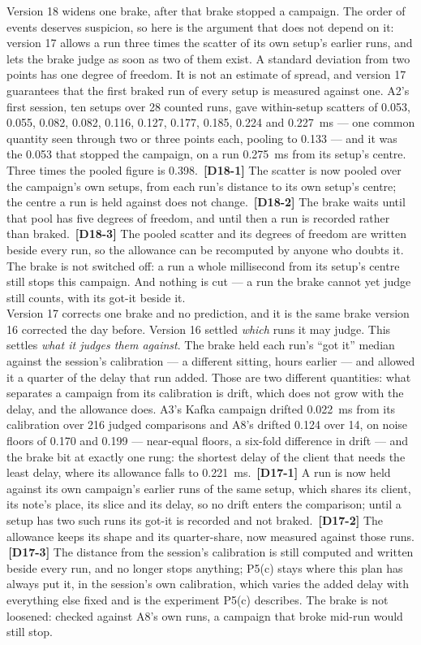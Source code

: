 \documentclass[11pt]{article}
\newcommand{\chgold}[1]{\,{\color{oldcol}\bfseries\footnotesize[#1]}}
\begin{document}
{Version 18 widens one brake, after that brake stopped a campaign. The order of events deserves suspicion, so here is the argument that does not depend on it: version 17 allows a run three times the scatter of its own setup's earlier runs, and lets the brake judge as soon as two of them exist. A standard deviation from two points has one degree of freedom. It is not an estimate of spread, and version 17 guarantees that the first braked run of every setup is measured against one. A2's first session, ten setups over 28 counted runs, gave within-setup scatters of 0.053, 0.055, 0.082, 0.082, 0.116, 0.127, 0.177, 0.185, 0.224 and 0.227~ms --- one common quantity seen through two or three points each, pooling to 0.133 --- and it was the 0.053 that stopped the campaign, on a run 0.275~ms from its setup's centre. Three times the pooled figure is 0.398. \chgold{D18-1} The scatter is now pooled over the campaign's own setups, from each run's distance to its own setup's centre; the centre a run is held against does not change. \chgold{D18-2} The brake waits until that pool has five degrees of freedom, and until then a run is recorded rather than braked. \chgold{D18-3} The pooled scatter and its degrees of freedom are written beside every run, so the allowance can be recomputed by anyone who doubts it. The brake is not switched off: a run a whole millisecond from its setup's centre still stops this campaign. And nothing is cut --- a run the brake cannot yet judge still counts, with its got-it beside it.\\[3pt]
Version 17 corrects one brake and no prediction, and it is the same brake version 16 corrected the day before. Version 16 settled \emph{which} runs it may judge. This settles \emph{what it judges them against}. The brake held each run's ``got it'' median against the session's calibration --- a different sitting, hours earlier --- and allowed it a quarter of the delay that run added. Those are two different quantities: what separates a campaign from its calibration is drift, which does not grow with the delay, and the allowance does. A3's Kafka campaign drifted 0.022~ms from its calibration over 216 judged comparisons and A8's drifted 0.124 over 14, on noise floors of 0.170 and 0.199 --- near-equal floors, a six-fold difference in drift --- and the brake bit at exactly one rung: the shortest delay of the client that needs the least delay, where its allowance falls to 0.221~ms. \chgold{D17-1} A run is now held against its own campaign's earlier runs of the same setup, which shares its client, its note's place, its slice and its delay, so no drift enters the comparison; until a setup has two such runs its got-it is recorded and not braked. \chgold{D17-2} The allowance keeps its shape and its quarter-share, now measured against those runs. \chgold{D17-3} The distance from the session's calibration is still computed and written beside every run, and no longer stops anything; P5(c) stays where this plan has always put it, in the session's own calibration, which varies the added delay with everything else fixed and is the experiment P5(c) describes. The brake is not loosened: checked against A8's own runs, a campaign that broke mid-run would still stop.\\[3pt]
}
\end{document}
